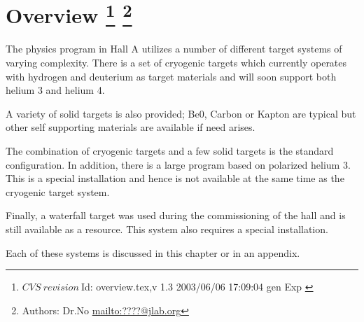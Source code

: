 \section[Overview]{ Overview
\footnote{
  $CVS~revision~ $Id: overview.tex,v 1.3 2003/06/06 17:09:04 gen Exp $ $
}
\footnote{Authors: Dr.No \url{mailto:????@jlab.org}}
}

The physics program in Hall A utilizes a number of different
target systems of varying complexity. There is a set of
cryogenic targets which currently operates with hydrogen and deuterium
as target materials and will soon support both helium 3 and
helium 4.

A variety of solid targets is also provided; Be0, Carbon or
Kapton are typical but other self supporting materials are available if need arises.

The combination of cryogenic targets and a few solid targets is
the standard configuration. In addition,
there is a large program based on polarized helium 3. This
is a special installation and hence is not available at the same
time as the cryogenic target system.

Finally, a waterfall target was used during the commissioning of
the hall and is still available as a resource. This system
also requires a special installation.

Each of these systems is discussed in this chapter or in an appendix.
%
%
%
